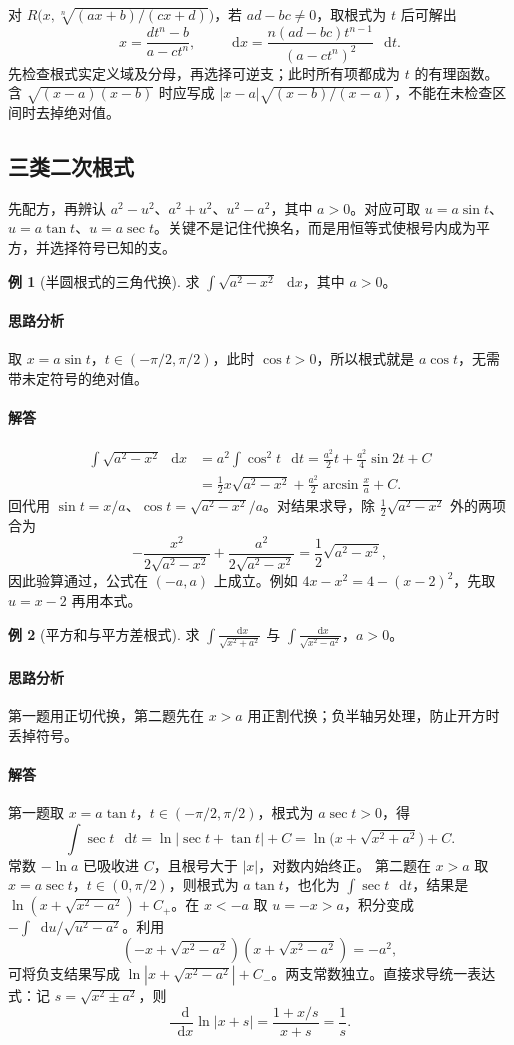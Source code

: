 \documentclass[UTF8,fontset=fandol,12pt,oneside,openany]{ctexrep}
\newcommand{\dd}{\mathop{}\!\mathrm d}
\theoremstyle{definition}
\newtheorem{example}{例}[chapter]
\begin{document}
对 $R\bigl(x,\sqrt[n]{(ax+b)/(cx+d)}\bigr)$，若 $ad-bc\ne0$，取根式为 $t$ 后可解出
\[
x=\frac{dt^n-b}{a-ct^n},\qquad
\dd x=\frac{n(ad-bc)t^{n-1}}{(a-ct^n)^2}\,\dd t.
\]
先检查根式实定义域及分母，再选择可逆支；此时所有项都成为 $t$ 的有理函数。含 $\sqrt{(x-a)(x-b)}$ 时应写成 $|x-a|\sqrt{(x-b)/(x-a)}$，不能在未检查区间时去掉绝对值。

\subsection{三类二次根式}
先配方，再辨认 $a^2-u^2$、$a^2+u^2$、$u^2-a^2$，其中 $a>0$。对应可取 $u=a\sin t$、$u=a\tan t$、$u=a\sec t$。关键不是记住代换名，而是用恒等式使根号内成为平方，并选择符号已知的支。

\begin{example}[半圆根式的三角代换]
求 $\displaystyle\int\sqrt{a^2-x^2}\,\dd x$，其中 $a>0$。
\end{example}
\paragraph{思路分析}取 $x=a\sin t$，$t\in(-\pi/2,\pi/2)$，此时 $\cos t>0$，所以根式就是 $a\cos t$，无需带未定符号的绝对值。
\paragraph{解答}
\begin{align*}
\int\sqrt{a^2-x^2}\,\dd x
&=a^2\int\cos^2t\,\dd t
=\frac{a^2}2t+\frac{a^2}4\sin2t+C\\
&=\frac12x\sqrt{a^2-x^2}+\frac{a^2}2\arcsin\frac xa+C.
\end{align*}
回代用 $\sin t=x/a$、$\cos t=\sqrt{a^2-x^2}/a$。对结果求导，除 $\frac12\sqrt{a^2-x^2}$ 外的两项合为
\[
-\frac{x^2}{2\sqrt{a^2-x^2}}+
\frac{a^2}{2\sqrt{a^2-x^2}}=\frac12\sqrt{a^2-x^2},
\]
因此验算通过，公式在 $(-a,a)$ 上成立。例如 $4x-x^2=4-(x-2)^2$，先取 $u=x-2$ 再用本式。

\begin{example}[平方和与平方差根式]
求 $\displaystyle\int\frac{\dd x}{\sqrt{x^2+a^2}}$ 与 $\displaystyle\int\frac{\dd x}{\sqrt{x^2-a^2}}$，$a>0$。
\end{example}
\paragraph{思路分析}第一题用正切代换，第二题先在 $x>a$ 用正割代换；负半轴另处理，防止开方时丢掉符号。
\paragraph{解答}第一题取 $x=a\tan t$，$t\in(-\pi/2,\pi/2)$，根式为 $a\sec t>0$，得
\[
\int\sec t\,\dd t=\ln|\sec t+\tan t|+C
=\ln\bigl(x+\sqrt{x^2+a^2}\bigr)+C.
\]
常数 $-\ln a$ 已吸收进 $C$，且根号大于 $|x|$，对数内始终正。
第二题在 $x>a$ 取 $x=a\sec t$，$t\in(0,\pi/2)$，则根式为 $a\tan t$，也化为 $\int\sec t\,\dd t$，结果是 $\ln(x+\sqrt{x^2-a^2})+C_+$。在 $x<-a$ 取 $u=-x>a$，积分变成 $-\int\dd u/\sqrt{u^2-a^2}$。利用
\[
(-x+\sqrt{x^2-a^2})(x+\sqrt{x^2-a^2})=-a^2,
\]
可将负支结果写成 $\ln|x+\sqrt{x^2-a^2}|+C_-$。两支常数独立。直接求导统一表达式：记 $s=\sqrt{x^2\pm a^2}$，则
\[
\frac{\dd}{\dd x}\ln|x+s|=\frac{1+x/s}{x+s}=\frac1s.
\]
\end{document}
